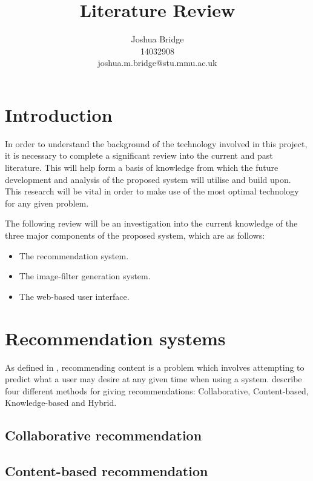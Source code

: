 \documentclass[a4paper,12pt]{article}
\title{Literature Review}
\author{Joshua Bridge \\14032908 \\joshua.m.bridge@stu.mmu.ac.uk}
\begin{document}
\maketitle

\tableofcontents

\doublespacing

\section{Introduction}
  In order to understand the background of the technology involved in this project, it is necessary to complete a significant review into the current and past literature. This will help form a basis of knowledge from which the future development and analysis of the proposed system will utilise and build upon. This research will be vital in order to make use of the most optimal technology for any given problem.

  The following review will be an investigation into the current knowledge of the three major components of the proposed system, which are as follows:

  \begin{itemize}
    \item The recommendation system.
    \item The image-filter generation system.
    \item The web-based user interface.
  \end{itemize}

\section{Recommendation systems}
  As defined in \cite{ricci2011introduction}, recommending content is a problem which involves attempting to predict what a user may desire at any given time when using a system. \cite{jannach2010recommender} describe four different methods for giving recommendations: Collaborative, Content-based, Knowledge-based and Hybrid.

  \subsection{Collaborative recommendation}

  \subsection{Content-based recommendation}
\end{document}
